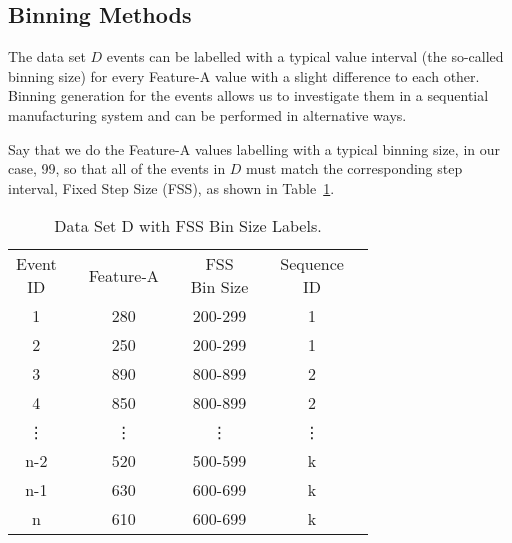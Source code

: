 \subsection*{Binning Methods}
%

The data set $D$ events can be labelled with a typical value interval (the so-called binning size) for every Feature-A value with a slight difference to each other. Binning generation for the events allows us to investigate them in a sequential manufacturing system and can be performed in alternative ways.

Say that we do the Feature-A values labelling with a typical binning size, in our case, 99, so that all of the events in $D$ must match the corresponding step interval, Fixed Step Size (FSS), as shown in Table~\ref{Tab: D-dataset-FSS}. 
\begin{table}[hb!]
	\centering
	\begin{tabular}{|ccccccc|l}
		\cline{1-7}
		\makecell{Event\\ID} 	&& Feature-A    	&& \makecell{FSS\\Bin Size}&& \makecell{Sequence\\ID} &  \\ \cline{1-7}
		1 	      && 280	    && 200-299	&& 1 		   &  \\
		2 		  && 250	    && 200-299	&& 1 		   &  \\
		3 	      && 890	    && 800-899	&& 2 		   &  \\
		4 		  && 850	    && 800-899	&& 2 		   &  \\
		\vdots	  && \vdots  	&& \vdots	&& \vdots 	   &  \\
		n-2 	  && 520	    && 500-599	&& k 		   &  \\
		n-1       && 630	    && 600-699	&& k 		   &  \\
		n 		  && 610	    && 600-699	&& k 		   &  \\ \cline{1-7}
	\end{tabular}
	\caption{Data Set D with FSS Bin Size Labels.}
	\label{Tab: D-dataset-FSS}
\end{table}

